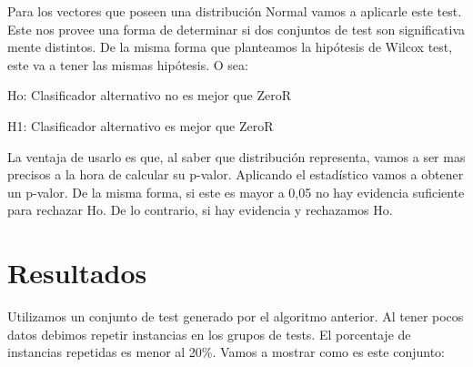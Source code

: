 
Para los vectores que poseen una distribución Normal vamos a aplicarle este test. Este nos provee una forma de determinar si dos conjuntos de test son significativa mente distintos. De la misma forma que planteamos la hipótesis de Wilcox test, este va a tener las mismas hipótesis. O sea: 

\vspace{0.5cm}
\hspace{2cm}Ho: Clasificador alternativo no es mejor que ZeroR
\vspace{0.25cm}

\hspace{2cm}H1: Clasificador alternativo es mejor que ZeroR
\vspace{0.5cm}

La ventaja de usarlo es que, al saber que distribución representa, vamos a ser mas precisos a la hora de calcular su p-valor. Aplicando el estadístico vamos a obtener un p-valor. De la misma forma, si este es mayor a 0,05 no hay evidencia suficiente para rechazar Ho. De lo contrario, si hay evidencia y rechazamos Ho.

\section{Resultados}

Utilizamos un conjunto de test generado por el algoritmo anterior. Al tener pocos datos debimos repetir instancias en los grupos de tests. El porcentaje de instancias repetidas es menor al 20\%. Vamos a mostrar como es este conjunto:

\begin{figure}[H]
\centering
\pgfplotsset{width=10cm, height=6cm, compat=1.9}
\end{figure}

